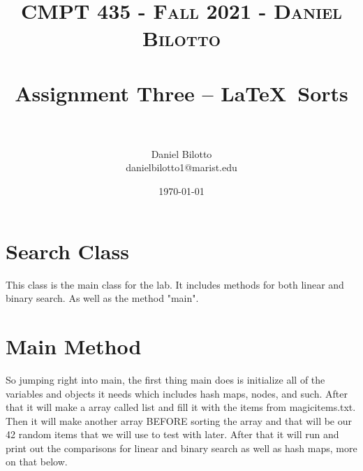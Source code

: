 \documentclass[letterpaper, 10pt]{article}
\title{	
   \normalfont \normalsize 
   \textsc{CMPT 435 - Fall 2021 - Daniel Bilotto} \\[10pt] %
   \horrule{0.5pt} \\[0.25cm] 	%
   \huge Assignment Three -- \LaTeX ~Sorts \\     	    %
   \horrule{0.5pt} \\[0.25cm] 	%
}
\author{Daniel Bilotto \\ \normalsize danielbilotto1@marist.edu}
\date{\normalsize\today} 	%
\begin{document}
\maketitle %


\section{Search Class}
This class is the main class for the lab. It includes methods for both linear and binary search. As well as the method "main".
\section{Main Method}
So jumping right into main, the first thing main does is initialize all of the variables and objects it needs which includes hash maps, nodes, and such. After that it will make a array called list and fill it with the items from magicitems.txt. Then it will make another array BEFORE sorting the array and that will be our 42 random items that we will use to test with later. After that it will run and print out the comparisons for linear and binary search as well as hash maps, more on that below.
\end{document}

